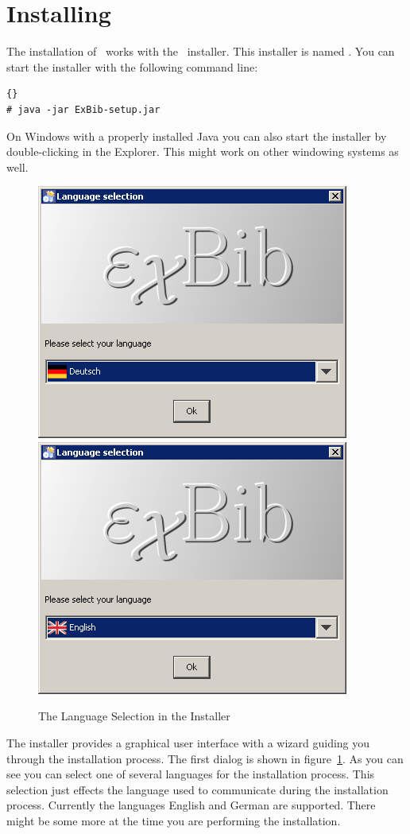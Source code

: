 \section{Installing \ExBib}\label{sec:install}

The installation of \ExBib\ works with the \ExBib\ installer. This
installer is named . You can start the installer
with the following command line:

\begin{lstlisting}{}
# java -jar ExBib-setup.jar
\end{lstlisting}

On Windows with a properly installed Java
you can also start the installer by double-clicking
 in the Explorer. This might
work on other windowing systems as well.

\begin{figure}[!ht]
  \centering
  \includegraphics[width=.45\textwidth]{img/inst1}\hfill
  \includegraphics[width=.45\textwidth]{img/inst2}
  \caption{The Language Selection in the Installer}
  \label{fig:inst1}
\end{figure}
The installer provides a graphical user interface with a wizard
guiding you through the installation process. The first dialog is
shown in figure~\ref{fig:inst1}. As you can see you can select one of
several languages for the installation process. This selection just
effects the language used to communicate during the installation
process.  Currently the languages English and German are supported.
There might be some more at the time you are performing the
installation.

